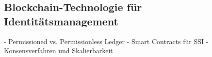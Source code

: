 \subsection{Blockchain-Technologie für Identitätsmanagement} \label{sec:Blockchain-Technologie für Identitätsmanagement}

- Permissioned vs. Permissionless Ledger
- Smart Contracts für SSI
- Konsensverfahren und Skalierbarkeit